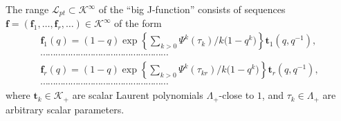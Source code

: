 \documentclass[pdftex]{sigma}
\def\K{\mathcal K}
\def\L{\mathcal L}
\def\f{{\mathbf f}}
\def\t{{\mathbf t}}
\begin{document}
\begin{theorem}\label{Theorem2} The range $\L_{pt}\subset \K^{\infty}$ of the ``big J-function'' consists of sequences $\f =(\f_1,\dots,\f_r,\allowbreak \dots) \in \K^{\infty}$ of the form
 \begin{gather*} \f_1(q) = (1-q) \exp\left\{ \sum_{k>0} \Psi^k(\tau_k)/k\big(1-q^k\big)\right\} \t_1\left(q,q^{-1}\right), \\
 \cdots\cdots\cdots\cdots\cdots\cdots\cdots\cdots\cdots\cdots\cdots\cdots\cdots\cdots\cdots\cdots\cdots \\
 \f_r(q) =(1-q) \exp\left\{ \sum_{k>0} \Psi^k(\tau_{kr})/k\big(1-q^k\big)\right\} \t_r\left(q,q^{-1}\right), \\
 \cdots\cdots\cdots\cdots\cdots\cdots\cdots\cdots\cdots\cdots\cdots\cdots\cdots\cdots\cdots\cdots\cdots \end{gather*}
 where $\t_k \in \K_{+}$ are scalar Laurent polynomials $\Lambda_{+}$-close to $1$, and $\tau_k\in \Lambda_{+}$ are arbitrary scalar parameters.
 \end{theorem}
\end{document}
